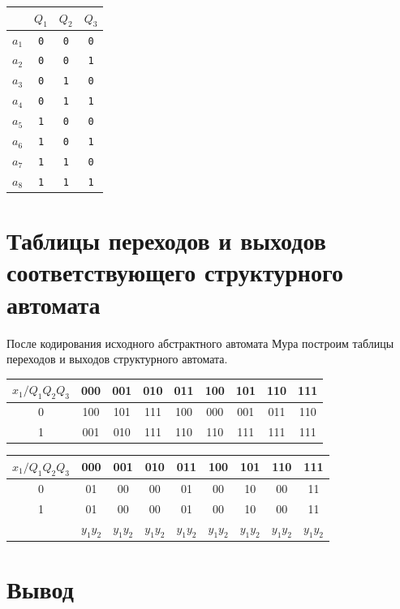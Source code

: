 \documentclass[12pt, a4paper]{article}
\begin{document}
\begin{tabular}{| c | c | c | c |}
  \hline
  & $Q_1$ & $Q_2$ & $Q_3$\\
  \hline
  $a_1$ & \texttt{0} & \texttt{0} & \texttt{0}\\
  $a_2$ & \texttt{0} & \texttt{0} & \texttt{1}\\
  $a_3$ & \texttt{0} & \texttt{1} & \texttt{0}\\
  $a_4$ & \texttt{0} & \texttt{1} & \texttt{1}\\
  $a_5$ & \texttt{1} & \texttt{0} & \texttt{0}\\
  $a_6$ & \texttt{1} & \texttt{0} & \texttt{1}\\
  $a_7$ & \texttt{1} & \texttt{1} & \texttt{0}\\
  $a_8$ & \texttt{1} & \texttt{1} & \texttt{1}\\
  \hline
\end{tabular}

\section*{Таблицы переходов и выходов соответствующего структурного автомата}

После кодирования исходного абстрактного автомата
Мура построим таблицы переходов и выходов структурного автомата.

\begin{tabular}{|*{9}{c|}}
  \hline
  $x_1/Q_1Q_2Q_3$ & 000 & 001 & 010 & 011 & 100 & 101 & 110 & 111\\\hline
  0 & 100 & 101 & 111 & 100 & 000 & 001 & 011 & 110\\\hline
  1 & 001 & 010 & 111 & 110 & 110 & 111 & 111 & 111\\\hline
\end{tabular}

\begin{tabular}{|*{9}{c|}}
  \hline
  $x_1/Q_1Q_2Q_3$ & 000 & 001 & 010 & 011 & 100 & 101 & 110 & 111\\\hline
  0 & 01 & 00 & 00 & 01 & 00 & 10 & 00 & 11\\\hline
  1 & 01 & 00 & 00 & 01 & 00 & 10 & 00 & 11\\\hline
   & $y_1y_2$ & $y_1y_2$ & $y_1y_2$ & $y_1y_2$ & $y_1y_2$ & $y_1y_2$ & $y_1y_2$ & $y_1y_2$\\\hline
\end{tabular}

\section*{Вывод}
\end{document}
